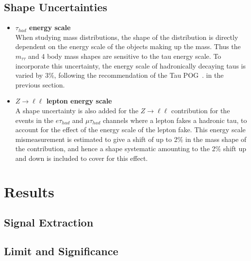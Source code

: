 \subsection{Shape Uncertainties}
\label{sec:systematicUncertainties_yield}

\begin{itemize}

\item \textbf{$\tau_{had}$ energy scale} \\
When studying mass distributions, the shape of the distribution is directly
dependent on the energy scale of the objects making up the mass. Thus the
$m_{\tau\tau}$ and 4 body mass shapes are sensitive to the tau energy scale.
To incorporate this uncertainty, the energy scale of hadronically decaying taus is varied by $3\%$,
following the recommendation of the Tau POG~\cite{TauIDRecommendation}. 
in the previous section.
\item \textbf{$Z \to \ell\ell$ lepton energy scale}\\
A shape uncertainty is also added for the $Z \to \ell\ell$ contribution for the
events in the $e\tau_{had}$ and $\mu\tau_{had}$ channels where a lepton fakes a
hadronic tau, to account for the effect of the energy scale of the lepton fake.
This energy scale mismeasurement is estimated to give a shift of up to 2$\%$ in the
mass shape of the contribution, and hence a shape systematic amounting to the
2$\%$ shift up and down is included to cover for this effect.

\end{itemize}

\section{Results}
\label{sec:results}

\subsection{Signal Extraction}
\label{sec:signalextraction}

\subsection{Limit and Significance}
\label{sec:significance}

